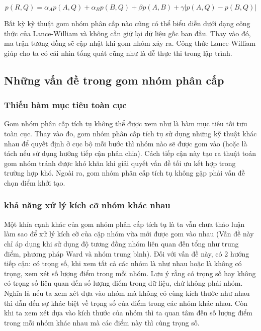\begin{equation}
\label{eq:2_Lance_William}
p(R,Q)=\alpha_Ap(A,Q) + \alpha_Bp(B,Q) + \beta p(A,B) + \gamma |p(A, Q) - p(B, Q)|
\end{equation}

Bất kỳ kỹ thuật gom nhóm phân cấp nào cũng có thể biểu diễn dưới dạng công thức của Lance-William và không cần giữ lại dữ liệu gốc ban đầu.
Thay vào đó, ma trận tương đồng sẽ cập nhật khi gom nhóm xảy ra.
Công thức Lance-William giúp cho ta có cái nhìn tổng quát cũng như là dễ thực thi trong lập trình.

\subsection{Những vấn đề trong gom nhóm phân cấp}
\subsubsection{Thiếu hàm mục tiêu toàn cục}
Gom nhóm phân cấp tích tụ không thể được xem như là hàm mục tiêu tối tưu toàn cục.
Thay vào đo, gom nhóm phân cấp tích tụ sử dụng những kỹ thuật khác nhau để quyết định ở cục bộ mỗi bước thì nhóm nào sẽ được gom vào (hoặc là tách nếu sử dụng hướng tiếp cận phân chia).
Cách tiếp cận này tạo ra thuật toán gom nhóm tránh được khó khăn khi giải quyết vấn đề tối ưu kết hợp trong trường hợp khó.
Ngoài ra, gom nhóm phân cấp tích tụ không gặp phải vấn đề chọn điểm khởi tạo.

\subsubsection{khả năng xử lý kích cỡ nhóm khác nhau}
Một khía cạnh khác của gom nhóm phân cấp tích tụ là ta vẫn chưa thảo luận làm sao để xử lý kích cỡ của cặp nhóm vừa mới được gom vào nhau (Vấn đề này chỉ áp dụng khi sử dụng độ tương đồng nhóm liên quan đến tổng như trung điểm, phương pháp Ward và nhóm trung bình).
Đối với vấn đề này, có 2 hướng tiếp cận: có trọng số, khi xem tất cả các nhóm là như nhau hoặc là không có trọng, xem xét số lượng điểm trong mỗi nhóm.
Lưu ý rằng có trọng số hay không có trọng số liên quan đến số lượng điểm trong dữ liệu, chứ không phải nhóm.
Nghĩa là nếu ta xem xét dựa vào nhóm mà không có cùng kích thước như nhau thì dẫn đến sự khác biệt về trọng số của điểm trong các nhóm khác nhau.
Còn khi ta xem xét dựa vào kích thước của nhóm thì ta quan tâm đến số lượng điểm trong mỗi nhóm khác nhau mà các điểm này thì cùng trọng số.

